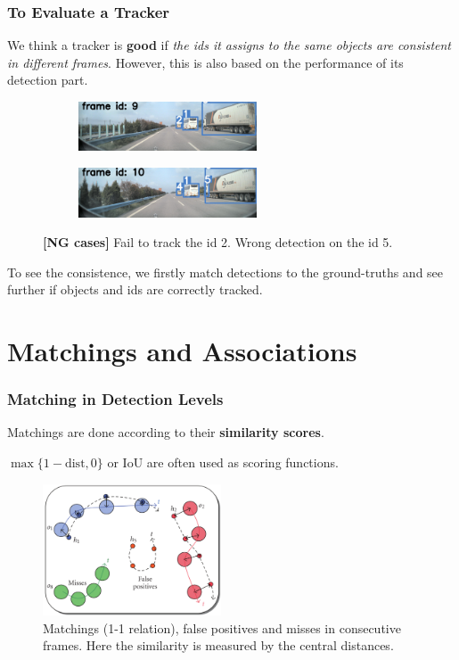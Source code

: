 \documentclass[slidetop, mathserif]{beamer}
\begin{document}
\begin{frame}
	\frametitle{To Evaluate a Tracker}

	We think a tracker is {\bf good} if
	\emph{the ids it assigns to the same objects are consistent in different frames}.
	However, this is also based on the performance of its detection part.

	\begin{figure}
		\begin{subfigure}{.48\textwidth}
		\includegraphics[width=150pt]{pics/track03.jpg}
		\end{subfigure}
		\begin{subfigure}{.48\textwidth}
		\includegraphics[width=150pt]{pics/track04.jpg}
		\end{subfigure}
		\caption{{\color{red}\bf [NG cases]} Fail to track the id 2.
			Wrong detection on the id 5.}
	\end{figure}

	To see the consistence, we firstly match detections to the ground-truths
	and see further if objects and ids are correctly tracked.

\end{frame}

\section{Matchings and Associations}

\begin{frame}
	\frametitle{Matching in Detection Levels}
			
	Matchings are done according to their {\bf similarity scores}.
	
	$\max\{1-\text{dist}, 0\}$ or IoU
	are often used as scoring functions.
			
	\begin{figure}
		\includegraphics[width=150pt]{pics/fig2.png}
		\caption{Matchings (1-1 relation), false positives and misses in consecutive frames.
		Here the similarity is measured by the central distances.}
	\end{figure}

\end{frame}
\end{document}
